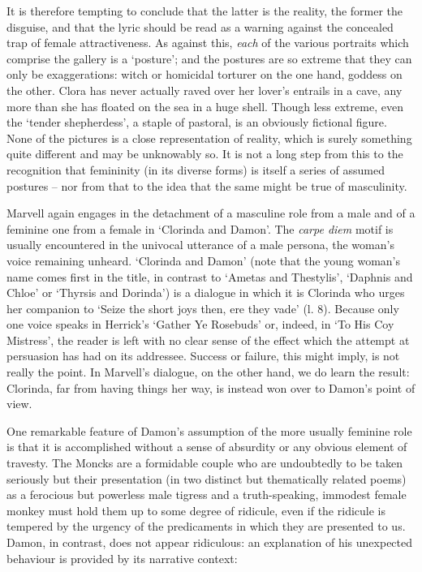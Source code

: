 ﻿\documentclass[12pt]{article}
\begin{document}
It
is therefore tempting to conclude that the latter is the reality, the former
the disguise, and that the lyric should be read as a warning against the
concealed trap of female attractiveness. As against this, \emph{each} of the various
portraits which comprise the gallery is a ‘posture’; and the postures are so
extreme that they can only be exaggerations: witch or homicidal torturer on the
one hand, goddess on the other. Clora has never actually raved over her lover’s
entrails in a cave, any more than she has floated on the sea in a huge shell.
Though less extreme, even the ‘tender shepherdess’, a staple of pastoral, is an
obviously fictional figure. None of the pictures is a close representation of
reality, which is surely something quite different and may be unknowably so. It
is not a long step from this to the recognition that femininity (in its diverse
forms) is itself a series of assumed postures – nor from that to the idea that
the same might be true of masculinity.

Marvell
again engages in the detachment of a masculine role from a male and of a
feminine one from a female in ‘Clorinda and Damon’. The \textit{carpe
diem} motif is usually encountered in the univocal utterance of a male persona, the
woman’s voice remaining unheard. ‘Clorinda and Damon’ (note that the young
woman’s name comes first in the title, in contrast to ‘Ametas and Thestylis’,
‘Daphnis and Chloe’ or ‘Thyrsis and Dorinda’) is a dialogue in which it is
Clorinda who urges her companion to ‘Seize the short joys then, ere they vade’
(l. 8). Because only one voice speaks in Herrick’s ‘Gather Ye Rosebuds’ or,
indeed, in ‘To His Coy Mistress’, the reader is left with no clear sense of the
effect which the attempt at persuasion has had on its addressee. Success or
failure, this might imply, is not really the point. In Marvell’s dialogue, on
the other hand, we do learn the result: Clorinda, far from having things her
way, is instead won over to Damon’s point of view.

One
remarkable feature of Damon’s assumption of the more usually feminine role is
that it is accomplished without a sense of absurdity or any obvious element of
travesty. The Moncks are a formidable couple who are undoubtedly to be taken
seriously but their presentation (in two distinct but thematically related
poems) as a ferocious but powerless male tigress and a truth-speaking, immodest
female monkey must hold them up to some degree of ridicule, even if the
ridicule is tempered by the urgency of the predicaments in which they are
presented to us. Damon, in contrast, does not appear ridiculous: an explanation
of his unexpected behaviour is provided by its narrative context:
\end{document}
